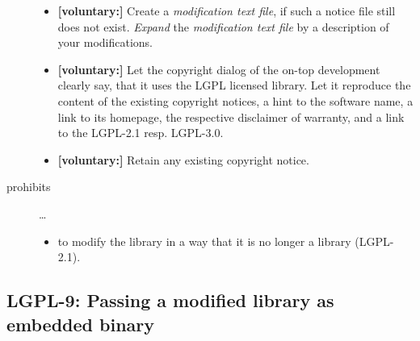 \begin{description}
\begin{itemize}
  \item \textbf{[voluntary:]} Create a \emph{modification text file}, if such a
  notice file still does not exist. \emph{Expand} the \emph{modification text
  file} by a description of your modifications.
    
  
  \item \textbf{[voluntary:]} Let the copyright dialog of the on-top development
  clearly say, that it uses the LGPL licensed library. Let it reproduce the
  content of the existing copyright notices, a hint to the software name, a link
  to its homepage, the respective disclaimer of warranty, and a link to the
  LGPL-2.1 resp. LGPL-3.0.   
  
  \item \textbf{[voluntary:]} Retain any existing copyright notice. 
  
\end{itemize}

\item[prohibits] \ldots
\begin{itemize}
  \item to modify the library in a way that it is no longer a library
  (LGPL-2.1).
\end{itemize}

\end{description}


\subsection{LGPL-9: Passing a modified library as embedded binary}

